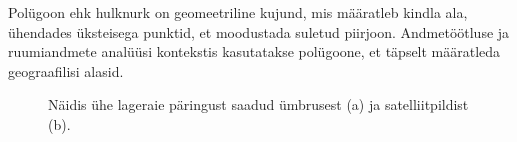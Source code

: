 Polügoon ehk hulknurk on geomeetriline kujund, mis määratleb kindla ala, ühendades üksteisega
punktid, et moodustada suletud piirjoon. Andmetöötluse ja ruumiandmete analüüsi
kontekstis kasutatakse polügoone, et täpselt määratleda geograafilisi alasid. \cite{WhatLocationPolygon}


\begin{figure}[H]
    \centering
    \hspace{-0.5cm}


    \caption{Näidis ühe lageraie päringust saadud ümbrusest (a) ja satelliitpildist (b).}
    \label{fig:sidebyside_teatis_sat_img}
\end{figure}

